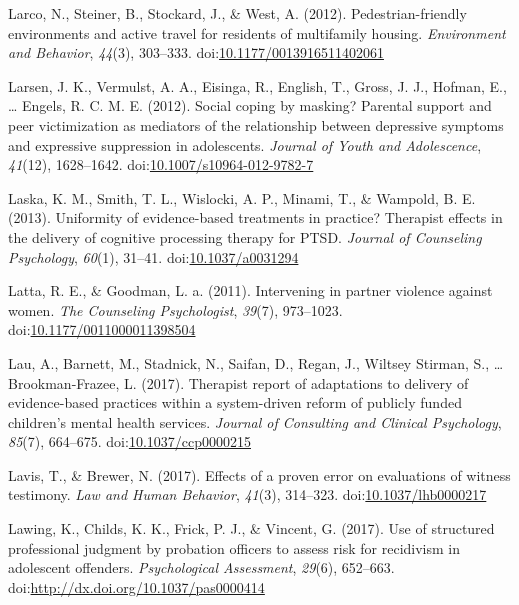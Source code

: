 \documentclass[english,man]{apa6}
\begin{document}
\hypertarget{ref-Larco2012}{}
Larco, N., Steiner, B., Stockard, J., \& West, A. (2012).
Pedestrian-friendly environments and active travel for residents of
multifamily housing. \emph{Environment and Behavior}, \emph{44}(3),
303--333.
doi:\href{https://doi.org/10.1177/0013916511402061}{10.1177/0013916511402061}

\hypertarget{ref-Larsen2012}{}
Larsen, J. K., Vermulst, A. A., Eisinga, R., English, T., Gross, J. J.,
Hofman, E., \ldots{} Engels, R. C. M. E. (2012). Social coping by
masking? Parental support and peer victimization as mediators of the
relationship between depressive symptoms and expressive suppression in
adolescents. \emph{Journal of Youth and Adolescence}, \emph{41}(12),
1628--1642.
doi:\href{https://doi.org/10.1007/s10964-012-9782-7}{10.1007/s10964-012-9782-7}

\hypertarget{ref-Laska2013}{}
Laska, K. M., Smith, T. L., Wislocki, A. P., Minami, T., \& Wampold, B.
E. (2013). Uniformity of evidence-based treatments in practice?
Therapist effects in the delivery of cognitive processing therapy for
PTSD. \emph{Journal of Counseling Psychology}, \emph{60}(1), 31--41.
doi:\href{https://doi.org/10.1037/a0031294}{10.1037/a0031294}

\hypertarget{ref-Latta2011}{}
Latta, R. E., \& Goodman, L. a. (2011). Intervening in partner violence
against women. \emph{The Counseling Psychologist}, \emph{39}(7),
973--1023.
doi:\href{https://doi.org/10.1177/0011000011398504}{10.1177/0011000011398504}

\hypertarget{ref-Lau2017}{}
Lau, A., Barnett, M., Stadnick, N., Saifan, D., Regan, J., Wiltsey
Stirman, S., \ldots{} Brookman-Frazee, L. (2017). Therapist report of
adaptations to delivery of evidence-based practices within a
system-driven reform of publicly funded children's mental health
services. \emph{Journal of Consulting and Clinical Psychology},
\emph{85}(7), 664--675.
doi:\href{https://doi.org/10.1037/ccp0000215}{10.1037/ccp0000215}

\hypertarget{ref-Lavis2017}{}
Lavis, T., \& Brewer, N. (2017). Effects of a proven error on
evaluations of witness testimony. \emph{Law and Human Behavior},
\emph{41}(3), 314--323.
doi:\href{https://doi.org/10.1037/lhb0000217}{10.1037/lhb0000217}

\hypertarget{ref-Lawing2017}{}
Lawing, K., Childs, K. K., Frick, P. J., \& Vincent, G. (2017). Use of
structured professional judgment by probation officers to assess risk
for recidivism in adolescent offenders. \emph{Psychological Assessment},
\emph{29}(6), 652--663.
doi:\href{https://doi.org/http://dx.doi.org/10.1037/pas0000414}{http://dx.doi.org/10.1037/pas0000414}
\end{document}
